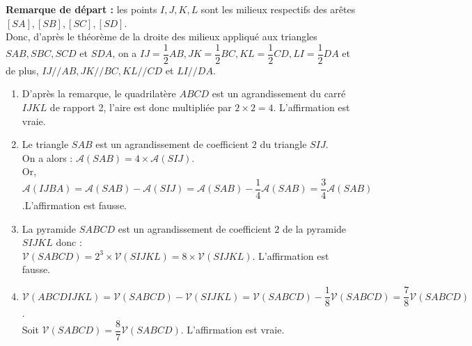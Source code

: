    {\bf Remarque de départ :} les points $I, J, K, L$ sont les milieux respectifs des arêtes $[SA], [SB], [SC], [SD]$. \\
   Donc, d'après le théorème de la droite des milieux appliqué aux triangles $SAB, SBC, SCD$ et $SDA$, on a $IJ =\dfrac12 AB, JK =\dfrac12 BC, KL =\dfrac12 CD, LI =\dfrac12DA$ et de plus, $IJ // AB, JK // BC, KL // CD$ et $LI // DA$. \\ [1mm]
   \begin{enumerate}
      \item D'après la remarque, le quadrilatère $ABCD$ est un  agrandissement du carré $IJKL$ de rapport 2, l'aire est donc multipliée par $2\times2 =4$. {\blue L'affirmation est vraie}.
      \item Le triangle $SAB$ est un agrandissement de coefficient $2$ du triangle $SIJ$. \\
         On a alors : $\mathcal{A}(SAB) =4\times \mathcal{A}(SIJ)$. \\
         Or, $\mathcal{A}(IJBA) =\mathcal{A}(SAB)-\mathcal{A}(SIJ) =\mathcal{A}(SAB)-\dfrac14\mathcal{A}(SAB) =\dfrac34\mathcal{A}(SAB)$.{\blue L'affirmation est fausse}.
      \item La pyramide $SABCD$ est un agrandissement de coefficient $2$ de la pyramide $SIJKL$ donc : \\
         $\mathcal{V}(SABCD) =2^3\times \mathcal{V}(SIJKL) =8\times\mathcal{V}(SIJKL)$. {\blue L'affirmation est fausse}.
      \item $\mathcal{V}(ABCDIJKL) =\mathcal{V}(SABCD)-\mathcal{V}(SIJKL) =\mathcal{V}(SABCD)-\dfrac18\mathcal{V}(SABCD) =\dfrac78\mathcal{V}(SABCD)$. \\
         Soit $\mathcal{V}(SABCD) =\dfrac87\mathcal{V}(SABCD)$. {\blue L'affirmation est vraie}.
   \end{enumerate}
